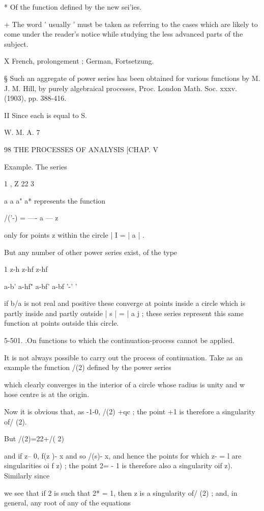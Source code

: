 {{* Of the function defined by the new sei'ies.

+ The word ' usually ' must be taken as referring to the cases which
are likely to come under the reader's notice while studying the less
advanced parts of the subject.

X French, prolongement ; German, Fortsetzung.

§ Such an aggregate of power series has been obtained for various
functions by M. J. M. Hill, by purely algebraical processes, Proc.
London Math. Soc. xxxv. (1903), pp. 388-416.

II Since each is equal to S.

W. M. A. 7



98 THE PROCESSES OF ANALYSIS [CHAP. V

Example. The series

1 , Z 22 3

a a a" a* represents the function

/('-) = —- a — z

only for points z within the circle | I = | a | .

But any number of other power series exist, of the type

1 z-h z-hf z-hf

a-b' a-hf" a-bf' a-bf '-' '

if b/a is not real and positive these converge at points inside a
circle which is partly inside and partly outside | s | = | a j ; these
series represent this same function at points outside this circle.

5-501. .On functions to which the continuation-process cannot be
applied.

It is not always possible to carry out the process of continuation.
Take as an example the function /(2) defined by the power series

which clearly converges in the interior of a circle whose radius is
unity and w hose centre is at the origin.

Now it is obvious that, as -1-0, /(2) +qc ; the point +1 is therefore
a singularity of/ (2).

But /(2)=22+/( 2)

and if z-- 0, f(z )- x and so /(s)- x, and hence the points for which
z- = l are singularities oi f z) ; the point 2= - 1 is therefore also
a singularity oif z). Similarly since

we see that if 2 is such that 2* = 1, then z is a singularity of/ (2)
; and, in general, any root of any of the equations

}}
